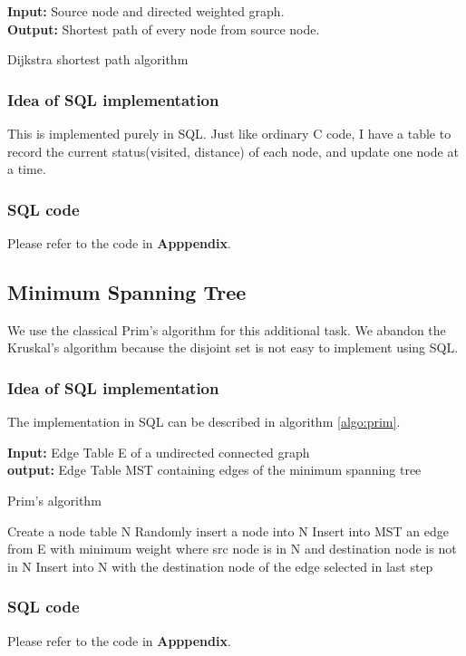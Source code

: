 \begin{algorithm}[!htbf]
{\bf Input:} Source node and directed weighted graph. \\
{\bf Output:} Shortest path of every node from source node. 
\begin{algorithmic}
\caption{Dijkstra shortest path algorithm}
\ENDFOR
{}
        \ENDIF
    \ENDFOR
\ENDWHILE
\end{algorithmic}
\label{algo:dijkstra}
\end{algorithm}

\subsubsection{Idea of SQL implementation}
This is implemented purely in SQL. Just like ordinary C code, I have a table to record the current status(visited, distance) of each node, and update one node at a time. 

\subsubsection{SQL code}
Please refer to the code in {\bf Apppendix}.

\subsection{Minimum Spanning Tree}
We use the classical Prim's algorithm for this additional task. We abandon the Kruskal's algorithm because the disjoint set is not easy to implement using SQL.

\subsubsection{Idea of SQL implementation}
The implementation in SQL can be described in algorithm \ref{algo:prim}.
 
\begin{algorithm}
{\bf Input:} Edge Table E of a undirected connected graph \\
{\bf output:} Edge Table MST containing edges of the minimum spanning tree
\begin{algorithmic}
\caption{Prim's algorithm}
\STATE Create a node table N
\STATE Randomly insert a node into N
	\STATE Insert into MST an edge from E with minimum weight where src node is in N and destination node is not in N
	\STATE Insert into N with the destination node of the edge selected in last step
\ENDFOR
\end{algorithmic}
\label{algo:prim}
\end{algorithm}

\subsubsection{SQL code}
Please refer to the code in {\bf Apppendix}.



